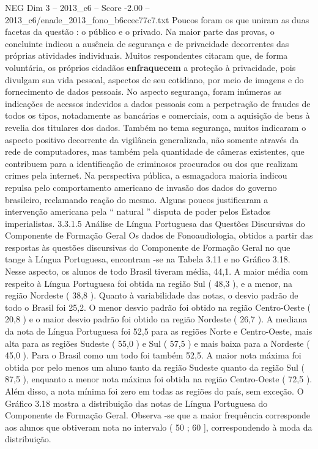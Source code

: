 \begin{textsample}{NEG Dim 3 – 2013\_c6 – Score -2.00 – 2013\_c6/enade\_2013\_fono\_b6ccec77c7.txt}
Poucos foram os que uniram as duas facetas da questão : o público e o privado.
Na maior parte das provas, o concluinte indicou a ausência de segurança e de privacidade decorrentes das próprias atividades individuais.
Muitos respondentes citaram que, de forma voluntária, os próprios cidadãos \textbf{enfraquecem} a proteção à privacidade, pois divulgam sua vida pessoal, aspectos de seu cotidiano, por meio de imagens e do fornecimento de dados pessoais.
No aspecto segurança, foram inúmeras as indicações de acessos indevidos a dados pessoais com a perpetração de fraudes de todos os tipos, notadamente as bancárias e comerciais, com a aquisição de bens à revelia dos titulares dos dados.
Também no tema segurança, muitos indicaram o aspecto positivo decorrente da vigilância generalizada, não somente através da rede de computadores, mas também pela quantidade de câmeras existentes, que contribuem para a identificação de criminosos procurados ou dos que realizam crimes pela internet.
Na perspectiva pública, a esmagadora maioria indicou repulsa pelo comportamento americano de invasão dos dados do governo brasileiro, reclamando reação do mesmo.
Alguns poucos justificaram a intervenção americana pela “ natural ” disputa de poder pelos Estados imperialistas. 3.3.1.5 Análise de Língua Portuguesa das Questões Discursivas do Componente de Formação Geral Os dados de Fonoaudiologia, obtidos a partir das respostas às questões discursivas do Componente de Formação Geral no que tange à Língua Portuguesa, encontram -se na Tabela 3.11 e no Gráfico 3.18.
Nesse aspecto, os alunos de todo Brasil tiveram média, 44,1.
A maior média com respeito à Língua Portuguesa foi obtida na região Sul ( 48,3 ), e a menor, na região Nordeste ( 38,8 ).
Quanto à variabilidade das notas, o desvio padrão de todo o Brasil foi 25,2.
O menor desvio padrão foi obtido na região Centro-Oeste ( 20,8 ) e o maior desvio padrão foi obtido na região Nordeste ( 26,7 ).
A mediana da nota de Língua Portuguesa foi 52,5 para as regiões Norte e Centro-Oeste, mais alta para as regiões Sudeste ( 55,0 ) e Sul ( 57,5 ) e mais baixa para a Nordeste ( 45,0 ).
Para o Brasil como um todo foi também 52,5.
A maior nota máxima foi obtida por pelo menos um aluno tanto da região Sudeste quanto da região Sul ( 87,5 ), enquanto a menor nota máxima foi obtida na região Centro-Oeste ( 72,5 ).
Além disso, a nota mínima foi zero em todas as regiões do país, sem exceção.
O Gráfico 3.18 mostra a distribuição das notas de Língua Portuguesa do Componente de Formação Geral.
Observa -se que a maior frequência corresponde aos alunos que obtiveram nota no intervalo ( 50 ; 60 ], correspondendo à moda da distribuição.

\end{textsample}
